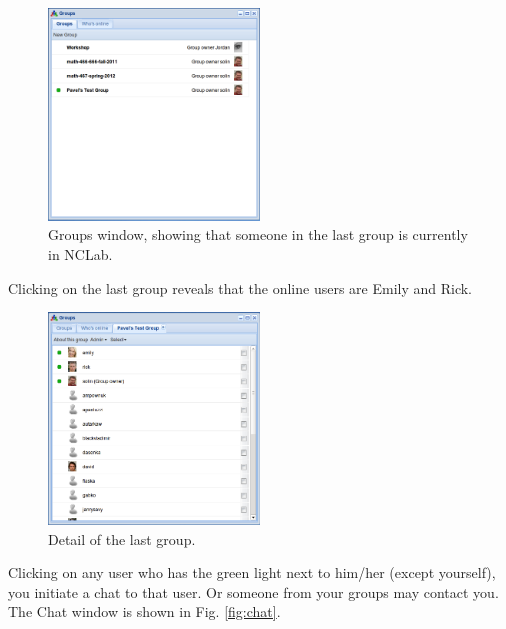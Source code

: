 \documentclass[article,A4,12pt]{llncs}
\begin{document}
\begin{figure}[!ht]
\begin{center}
\includegraphics[width=0.5\textwidth]{img/groups.png}
\end{center}
\caption{Groups window, showing that someone in the last group is currently in NCLab.}
\label{fig:groups}
\end{figure}

\newpage
\noindent
Clicking on the last group 
reveals that the online users are Emily and Rick.
\begin{figure}[!ht]
\begin{center}
\includegraphics[width=0.5\textwidth]{img/groups-2.png}
\end{center}
\caption{Detail of the last group.}
\label{fig:groups-2}
\end{figure}

\noindent
Clicking on any user who has the green light next to him/her (except yourself),
you initiate a chat to that user. Or someone from your groups may contact you. 
The Chat window is shown in Fig. \ref{fig:chat}.
\end{document}
